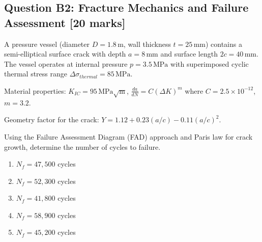 \documentclass[12pt,a4paper]{article}
\begin{document}
\begin{questionbox}
\subsection*{Question B2: Fracture Mechanics and Failure Assessment [20 marks]}

A pressure vessel (diameter $D = 1.8\,\text{m}$, wall thickness $t = 25\,\text{mm}$) contains 
a semi-elliptical surface crack with depth $a = 8\,\text{mm}$ and surface length $2c = 40\,\text{mm}$.
The vessel operates at internal pressure $p = 3.5\,\text{MPa}$ with superimposed cyclic thermal 
stress range $\Delta\sigma_{thermal} = 85\,\text{MPa}$.

Material properties: $K_{IC} = 95\,\text{MPa}\sqrt{\text{m}}$, 
$\frac{da}{dN} = C(\Delta K)^m$ where $C = 2.5\times10^{-12}$, $m = 3.2$.

Geometry factor for the crack: $Y = 1.12 + 0.23(a/c) - 0.11(a/c)^2$.

\begin{center}
\end{center}

Using the Failure Assessment Diagram (FAD) approach and Paris law for crack growth, 
determine the number of cycles to failure.

\begin{mcqbox}
\begin{enumerate}[label=(\Alph*),leftmargin=*]
    \item $N_f = 47,500$ cycles
    \item $N_f = 52,300$ cycles
    \item $N_f = 41,800$ cycles
    \item $N_f = 58,900$ cycles
    \item $N_f = 45,200$ cycles
\end{enumerate}
\end{mcqbox}
\end{questionbox}
\end{document}
